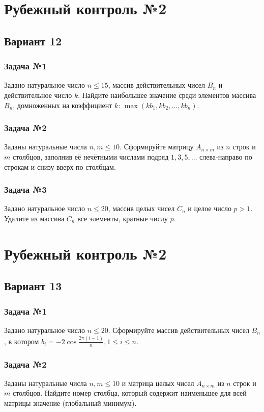 \documentclass[12pt,a5paper,landscape]{report}
\begin{document}
\clearpage
\section*{Рубежный контроль №2}
\subsection*{Вариант 12}
\subsubsection*{Задача №1}
Задано натуральное число $n \le 15$, массив действительных чисел $B_n$ и действительное число $k$. Найдите наибольшее значение среди элементов массива $B_n$, домноженных на коэффициент $k$: $\max({k b_1, k b_2, \ldots, k b_n})$.
\subsubsection*{Задача №2}
Заданы натуральные числа $n, m \le 10$. Сформируйте матрицу $A_{n \times m}$ из $n$ строк и $m$ столбцов, заполнив её нечётными числами подряд $1, 3, 5, \ldots$ слева-направо по строкам и снизу-вверх по столбцам.
\subsubsection*{Задача №3}
Задано натуральное число $n \le 20$, массив целых чисел $C_n$ и целое число $p > 1$. Удалите из массива $C_n$ все элементы, кратные числу $p$.


\clearpage
\section*{Рубежный контроль №2}
\subsection*{Вариант 13}
\subsubsection*{Задача №1}
Задано натуральное число $n \le 20$. Сформируйте массив действительных чисел $B_n$, в котором $b_i = -2 \cos { \frac {2 \pi (i-1)} {n} }, 1 \le i \le n$.
\subsubsection*{Задача №2}
Заданы натуральные числа $n, m \le 10$ и матрица целых чисел $A_{n \times m}$ из $n$ строк и $m$ столбцов. Найдите номер столбца, который содержит наименьшее для всей матрицы значение (глобальный минимум).
\end{document}
